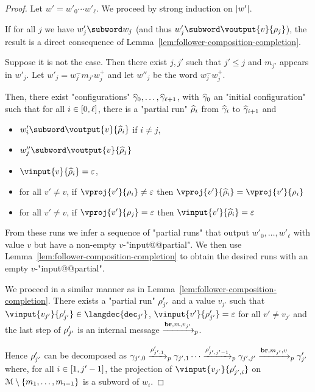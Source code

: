 \begin{proof}
	Let $w' = w'_0 \cdots w'_\ell$.
	We proceed by strong induction on $|w'|$.
	
	If for all $j$ we have $w'_j \subword w_j$  (and thus $w'_j \subword \voutput{v}{\run_j}$), the result is a direct consequence of Lemma~\ref{lem:follower-composition-completion}.
	
	Suppose it is not the case. Then there exist $j, j'$ such that $j' \leq j$ and $m_{j'}$ appears in $w'_j$. Let $w'_j = w^-_j m_{j'} w^+_j$ and let $w''_j$ be the word $w^-_jw^+_j$.
	
	Then, there exist "configurations" $\widehat{\gamma}_0, \ldots, \widehat{\gamma}_{\ell+1}$, with $\widehat{\gamma}_0$ an "initial configuration" such that for all $i \in[0,\ell]$, there is a "partial run" $\widehat{\rho}_i$ from $\widehat{\gamma}_i$ to $\widehat{\gamma}_{i+1}$ and
\begin{itemize}
	\item $w'_i \subword \voutput{v}{\widehat{\run}_i}$ if $i \neq j$,
	
	\item $w''_j \subword \voutput{v}{\widehat{\run}_j}$ 
	
	\item $\vinput{v}{\widehat{\run}_i} = \varepsilon$,
	
	\item for all $v' \neq v$, if $\vproj{v'}{\run_i} \neq \varepsilon$ then $\vproj{v'}{\widehat{\run}_i} = \vproj{v'}{\run_i}$
	
	\item for all $v' \neq v$, if $\vproj{v'}{\run_j} = \varepsilon$ then $\vinput{v'}{\widehat{\run}_i} = \varepsilon$
\end{itemize}

From these runs we infer a sequence of "partial runs" that output $w'_0, \ldots, w'_\ell$ with value $v$ but have a non-empty $v$-"input@@partial". We then use Lemma~\ref{lem:follower-composition-completion} to obtain the desired runs with an empty $v$-"input@@partial".

We proceed in a similar manner as in Lemma~\ref{lem:follower-composition-completion}.
There exists a "partial run" $\rho'_{j'}$ and a value $v_{j'}$ such that $\vinput{v_{j'}}{\run'_{j'}} \in \langdec{\decsymb_{j'}}$,  $\vinput{v'}{\run'_{j'}} = \varepsilon$ for all $v' \neq v_{j'}$  and the last step of $\rho'_{j'}$ is an internal message $\xrightarrow{\textbf{br}, m, v_{j'}}_{p}$.

Hence $\rho'_{j'}$ can be decomposed as $\gamma_{{j'},0} \xrightarrow{\rho_{{j'},1}'}_{p} \gamma_{{j'},1} \cdots \xrightarrow{\rho_{{j'},j'-1}'}_{p} \gamma_{{j'},j'} \xrightarrow{\textbf{br}, m_{j'}, v}_{p} \gamma'_{j'}$ where, for all $i \in [1,j'-1]$, the projection of $\vinput{v_{j'}}{\run_{{j'},i}'}$ on ${\mathcal{M}\setminus\{m_1, \ldots, m_{{i}-1}\}}$ is a subword of $w_i$.


\end{proof}
